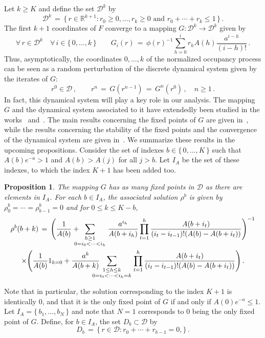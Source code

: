 \documentclass[a4paper,12pt]{article}
\newtheorem{proposition}[theorem]{Proposition}
\theoremstyle{definition}
\theoremstyle{remark}
\def \cD {\mathcal{D}}
\def \R {\mathbb{R}}
\def \lra {\longrightarrow}
\def \exa {e^{-a}}
\begin{document}
Let $k\geq K$ and define the set 
$\cD^k$ by
$$\cD^k\,=\,
\big\lbrace\,
r\in\R^{k+1}:
r_0\geq 0,\dots,r_k\geq 0 \text{ and } r_0+\cdots+r_k\leq 1
\,\big\rbrace\,.$$
The first $k+1$ coordinates of $F$ 
converge 
to a mapping $G:\cD^k\lra\cD^k$ given by
$$\forall\, r\in\cD^k\quad \forall\, i\in\lbrace\,0,\dots,k\,\rbrace\qquad
G_i(r)\,=\,\phi(r)^{-1}\displaystyle\sum_{h=0}^i r_h A(h)\frac{a^{i-h}}{(i-h)!}\,.$$
Thus, asymptotically,
the coordinates $0,\dots,k$ of the normalized occupancy process
can be seen as a random perturbation
of the discrete dynamical system given by the iterates of $G$:
$$r^0\in\cD\,,\qquad r^n\,=\,G(r^{n-1})\,=\,G^n(r^0)\,,\quad n\geq1\,.$$
In fact, this dynamical system will play a key role in our analysis. 
The mapping $G$ and the dynamical system associated to it
have extendedly been studied in the works~\cite{CD2} and~\cite{Dalmau}.
The main results concerning the fixed points of $G$ are given in~\cite{CD2},
while the results concerning the stability of the fixed points
and the convergence of the dynamical system are given in~\cite{Dalmau}.
We summarize these results in the upcoming propositions.
Consider the set of indexes $b\in\lbrace\,0,\dots,K\,\rbrace$ such that $A(b)\exa>1$ and
$A(b)>A(j)$ for all $j>b$.
Let $I_A$ be the set of these indexes, to which
the index $K+1$ has been added too.
\begin{proposition}
\label{fixed}
The mapping $G$ has as many fixed points in $\cD$ as there are elements in $I_A$.
For each $b\in I_A$,
the associated solution $\rho^b$ is given by 
$\rho^b_0=\cdots=\rho^b_{b-1}=0$ 
and for $0\leq k\leq K-b$,
\begin{multline*}
\rho^b(b+k)\,=\,
\Bigg(\frac{1}{A(b)}+\!\!\!\!\!\!\sum_{\genfrac{}{}{0pt}{1}{h\geq 1}{0=i_0<\cdots<i_h}}
\frac{a^{i_h}}{A(b+i_h)}\prod_{t=1}^h\frac{A(b+i_t)}{(i_t-i_{t-1})!(A(b)-A(b+i_t))}\Bigg)^{-1}
\\
\times\Bigg(\frac{1}{A(b)}1_{k=0}+
\frac{a^k}{A(b+k)}\!\!\!\!\!\!\!\!
\sum_{\genfrac{}{}{0pt}{1}{1\leq h\leq k}{0=i_0<\cdots<i_h=k}}
\prod_{t=1}^h \frac{A(b+i_t)}{(i_t-i_{t-1})!(A(b)-A(b+i_t))}\Bigg)
\,.\end{multline*}
\end{proposition}
Note that in particular, the solution corresponding to the index $K+1$
is identically $0$, and that it is the only fixed point of $G$
if and only if $A(0)\exa\leq1$.
Let $I_A=\lbrace\,b_1,\dots,b_N\,\rbrace$ and note that $N=1$ 
corresponds to $0$ being the only fixed point of $G$.
Define, for $b\in I_A$,
the set $D_b\subset \cD$ by
$$D_b\,=\,\Big\lbrace\,r\in \cD:
r_0+\cdots+r_{b-1}=0,\Big\rbrace\,.$$
\end{document}

